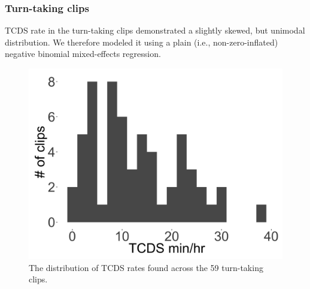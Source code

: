 \documentclass[floatsintext,man]{apa6}
\theoremstyle{definition}
\theoremstyle{definition}
\theoremstyle{definition}
\theoremstyle{remark}
\begin{document}
\FloatBarrier

\subsubsection{Turn-taking clips}\label{models-tcds-turntaking}

TCDS rate in the turn-taking clips demonstrated a slightly skewed, but
unimodal distribution. We therefore modeled it using a plain (i.e.,
non-zero-inflated) negative binomial mixed-effects regression.

\FloatBarrier

\begin{figure}[H]

{\centering \includegraphics[width=0.4\linewidth]{www/TCDS_turntaking_distribution} 

}

\caption{The distribution of TCDS rates found across the 59 turn-taking clips.}\label{fig:fig4}
\end{figure}

\FloatBarrier
\end{document}
